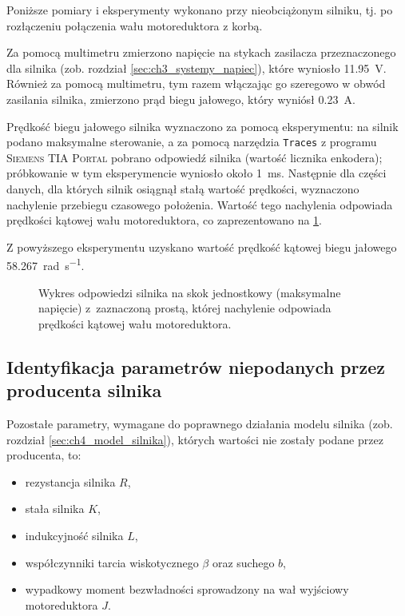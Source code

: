 Poniższe pomiary i eksperymenty wykonano przy nieobciążonym silniku, tj. po rozłączeniu połączenia wału motoreduktora z korbą.

Za pomocą multimetru zmierzono napięcie na stykach zasilacza przeznaczonego dla silnika (zob. rozdział \ref{sec:ch3_systemy_napiec}), które wyniosło \SI{11,95}{\volt}. Również za pomocą multimetru, tym razem włączając go szeregowo w obwód zasilania silnika, zmierzono prąd biegu jałowego, który wyniósł \SI{0,23}{\ampere}.

Prędkość biegu jałowego silnika wyznaczono za pomocą eksperymentu: na silnik podano maksymalne sterowanie, a za pomocą narzędzia \texttt{Traces} z programu \textsc{Siemens TIA Portal} pobrano odpowiedź silnika (wartość licznika enkodera); próbkowanie w tym eksperymencie wyniosło około \SI{1}{\milli\second}. Następnie dla części danych, dla których silnik osiągnął stałą wartość prędkości, wyznaczono nachylenie przebiegu czasowego położenia. Wartość tego nachylenia odpowiada prędkości kątowej wału motoreduktora, co zaprezentowano na \cref{fig:odpowiedz_silnika_na_maksymalny_skok_jednostkowy}.

Z powyższego eksperymentu uzyskano wartość prędkość kątowej biegu jałowego \SI[per-mode=fraction]{58,267}{\radian\per\second}.

\begin{figure}[h]
    \centering
    
    \caption{Wykres odpowiedzi silnika na skok jednostkowy (maksymalne napięcie) z~zaznaczoną prostą, której nachylenie odpowiada prędkości kątowej wału motoreduktora.}
    \label{fig:odpowiedz_silnika_na_maksymalny_skok_jednostkowy}
\end{figure}

\subsection{Identyfikacja parametrów niepodanych przez producenta silnika}
\label{subsec:ch5_identyfikacja_parametrow_niepodanych_przez_producenta_silnika}

Pozostałe parametry, wymagane do poprawnego działania modelu silnika (zob. rozdział \ref{sec:ch4_model_silnika}), których wartości nie zostały podane przez producenta, to:

\begin{itemize}
    \item rezystancja silnika $R$,
    \item stała silnika $K$,
    \item indukcyjność silnika $L$,
    \item współczynniki tarcia wiskotycznego $\beta$ oraz suchego $b$,
    \item wypadkowy moment bezwładności sprowadzony na wał wyjściowy motoreduktora $J$.
\end{itemize}

